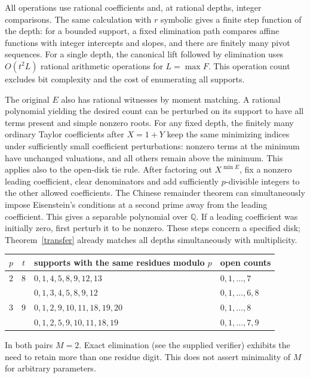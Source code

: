 \documentclass[11pt]{article}
\newcommand{\Q}{\mathbb Q}\newcommand{\Z}{\mathbb Z}
\begin{document}
All operations use rational coefficients and, at rational depths, integer comparisons. The same calculation with $r$ symbolic gives a finite step function of the depth: for a bounded support, a fixed elimination path compares affine functions with integer intercepts and slopes, and there are finitely many pivot sequences. For a single depth, the canonical lift followed by elimination uses $O(t^2L)$ rational arithmetic operations for $L=\max F$. This operation count excludes bit complexity and the cost of enumerating all supports.

The original $E$ also has rational witnesses by moment matching. A rational polynomial yielding the desired count can be perturbed on its support to have all terms present and simple nonzero roots. For any fixed depth, the finitely many ordinary Taylor coefficients after $X=1+Y$ keep the same minimizing indices under sufficiently small coefficient perturbations: nonzero terms at the minimum have unchanged valuations, and all others remain above the minimum. This applies also to the open-disk tie rule. After factoring out $X^{\min E}$, fix a nonzero leading coefficient, clear denominators and add sufficiently $p$-divisible integers to the other allowed coefficients. The Chinese remainder theorem can simultaneously impose Eisenstein's conditions at a second prime away from the leading coefficient. This gives a separable polynomial over $\Q$. If a leading coefficient was initially zero, first perturb it to be nonzero. These steps concern a specified disk; Theorem~\ref{transfer} already matches all depths simultaneously with multiplicity.

\begin{center}
\begin{tabular}{ccll}
\toprule $p$ & $t$ & supports with the same residues modulo $p$ & open counts\\\midrule
$2$ & $8$ & $0,1,4,5,8,9,12,13$ & $0,1,\ldots,7$\\
    &     & $0,1,3,4,5,8,9,12$ & $0,1,\ldots,6,8$\\
$3$ & $9$ & $0,1,2,9,10,11,18,19,20$ & $0,1,\ldots,8$\\
    &     & $0,1,2,5,9,10,11,18,19$ & $0,1,\ldots,7,9$\\\bottomrule
\end{tabular}
\end{center}
In both pairs $M=2$. Exact elimination (see the supplied verifier) exhibits the need to retain more than one residue digit. This does not assert minimality of $M$ for arbitrary parameters.
\end{document}
